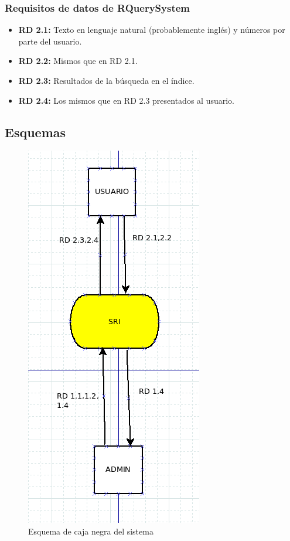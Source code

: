 \subsubsection{Requisitos de datos de RQuerySystem}

\begin{itemize}
	\item \textbf{RD 2.1:} Texto en lenguaje natural (probablemente inglés) y números por parte del usuario.
	\item \textbf{RD 2.2:} Mismos que en RD 2.1.
	\item \textbf{RD 2.3:} Resultados de la búsqueda en el índice.
	\item \textbf{RD 2.4:} Los mismos que en RD 2.3 presentados al usuario.
\end{itemize}

\subsection{Esquemas}

\begin{figure}[H] %
	\centering
	\includegraphics[scale=0.5]{caja-negra.png}  %
	\caption{Esquema de caja negra del sistema} 
\end{figure}

